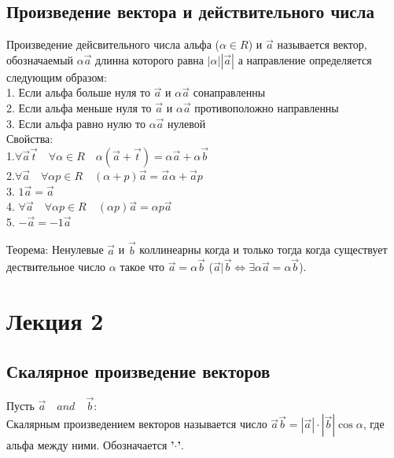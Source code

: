 \documentclass[a4paper, 12pt]{article}
\begin{document}
\subsection{Произведение вектора и действительного числа}
Произведение дейсвительного числа альфа ($ \alpha \in R $) и $ \vec{a} $ называется вектор, обозначаемый $ \alpha\vec{a} $ длинна которого равна $ |\alpha||\vec{a}| $ а направление определяется следующим образом:\\
1. Если альфа больше нуля то $ \vec{a} $ и $ \alpha\vec{a} $ сонаправленны\\
2. Если альфа меньше нуля то $ \vec{a} $ и $ \alpha\vec{a} $ противоположно направленны\\
3. Если альфа равно нулю то  $ \alpha\vec{a} $ нулевой\\
Свойства:\\
1.$\forall \vec{a}\vec{t} \quad\forall \alpha \in R \quad\alpha(\vec{a}+ \vec{t}) = \alpha \vec{a} + \alpha \vec{b}$\\
2.$  \forall \vec{a} \quad\forall \alpha p\in R  \quad(\alpha + p)\vec{a} = \vec{a} \alpha + \vec{a}p$\\
3. $  1 \vec{a} = \vec{a} $\\
4. $  \forall \vec{a} \quad\forall \alpha p \in R  \quad(\alpha p)\vec{a}= \alpha p\vec{a}$\\
5. $  -\vec{a} = -1\vec{a} $\\
\begin{mdframed}[backgroundcolor=blue!20] 
       Теорема: Ненулевые $ \vec{a} $ и $ \vec{b} $ коллинеарны когда и только тогда когда существует дествительное число $ \alpha $ такое что $ \vec{a} = \alpha\vec{b} $ ($\vec{a}|\vec{b} \Leftrightarrow \exists \alpha \vec{a} = \alpha\vec{b}$).
    \end{mdframed}

\section{Лекция 2}

\subsection{Скалярное произведение векторов}
Пусть $ \vec{a} \quad and \quad \vec{b} $:\\
Скалярным произведением векторов называется число $ \vec{a} \vec{b} = |\vec{a}|\cdot |\vec{b}|\cos \alpha $, где альфа между ними. Обозначается \textbf{'$ \cdot $'}.
\end{document}
